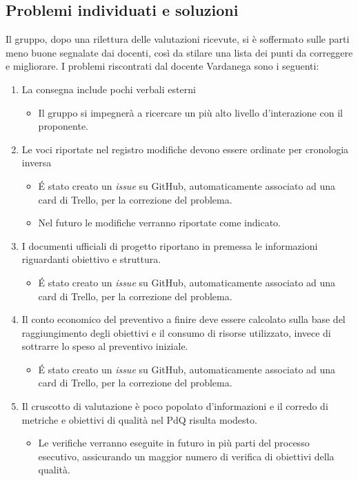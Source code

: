 \subsection{Problemi individuati e soluzioni}
Il gruppo, dopo una rilettura delle valutazioni ricevute, si è soffermato sulle parti meno buone segnalate dai docenti, così da stilare una lista dei punti da correggere e migliorare.
I problemi riscontrati dal docente Vardanega sono i seguenti:
\begin{enumerate}
	\item La consegna include pochi verbali esterni
	\begin{itemize}
		\item Il gruppo si impegnerà a ricercare un più alto livello d'interazione con il proponente.
	\end{itemize}
	\item Le voci riportate nel registro modifiche devono essere ordinate per cronologia inversa
	\begin{itemize}
		\item \'E stato creato un \textit{issue} su GitHub, automaticamente associato ad una card di Trello, per la correzione del problema.
		\item Nel futuro le modifiche verranno riportate come indicato. 
	\end{itemize}
	\item I documenti ufficiali di progetto riportano in premessa le informazioni riguardanti obiettivo e struttura.
	\begin{itemize}
		\item \'E stato creato un \textit{issue} su GitHub, automaticamente associato ad una card di Trello, per la correzione del problema.
	\end{itemize}
	\item Il conto economico del preventivo a finire deve essere calcolato sulla base del raggiungimento degli obiettivi e il consumo di risorse utilizzato, invece di sottrarre lo speso al preventivo iniziale.
	\begin{itemize}
		\item \'E stato creato un \textit{issue} su GitHub, automaticamente associato ad una card di Trello, per la correzione del problema.
	\end{itemize}	
	\item Il cruscotto di valutazione è poco popolato d'informazioni e il corredo di metriche e obiettivi di qualità nel PdQ risulta modesto.
	\begin{itemize}
    	\item Le verifiche verranno eseguite in futuro in più parti del processo esecutivo, assicurando un maggior numero di verifica di obiettivi della qualità.

\end{itemize}
\end{enumerate}
